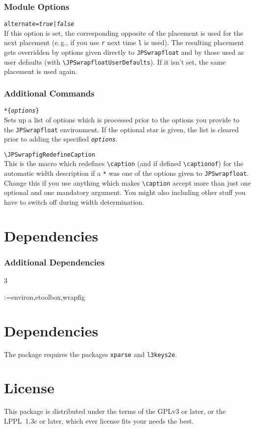 \documentclass[a4paper,10pt]{scrartcl}
\makeatletter
\newenvironment{codedescription*}{%
  \parindent=-3em
  \parskip=1em plus 2pt minus 2pt
  \vskip-\lastskip
  \hspace*{\parindent}\ignorespaces
}{\par}
\newcommand*\dependencies[2][3]{%
  \@ifstar
    {\section{Dependencies}}
    {\subsubsection{Additional Dependencies}}%
  \begin{multicols}{#1}
    \begin{itemize}%
      \@for\cs:={#2}\do{%
        \item\texttt{\cs}}%
    \end{itemize}%
  \end{multicols}}%
\newcommand*\optionTF{\textit{true}{\normalfont|}\textit{false}}
\makeatother
\begin{document}
\subsubsection{Module Options}
\begin{codedescription*}
\texttt{alternate=\optionTF}\\
  If this option is set, the corresponding opposite of the placement is used for
  the next placement (e.\,g., if you use \texttt{r} next time \texttt{l} is
  used). The resulting placement gets overridden by options given directly to
  \texttt{JPSwrapfloat} and by those used as user defaults (with
  \verb|\JPSwrapfloatUserDefaults|). If it isn't set, the same placement is used
  again.
\end{codedescription*}

\subsubsection{Additional Commands}
\begin{codedescription*}
\texttt{\string\JPSwrapfloatUserDefaults\textit{*}\{\textit{options}\}}\\
  Sets up a list of options which is processed prior to the options you provide
  to the \texttt{JPSwrapfloat} environment. If the optional star is given, the
  list is cleared prior to adding the specified \texttt{\textit{options}}.

\verb|\JPSwrapfigRedefineCaption|\\
  This is the macro which redefines \verb|\caption| (and if defined
  \verb|\captionof|) for the automatic width description if a \texttt{*} was one
  of the options given to \texttt{JPSwrapfloat}. Change this if you use anything
  which makes \verb|\caption| accept more than just one optional and one
  mandatory argument. You might also including other stuff you have to switch
  off during width determination.
\end{codedescription*}

\dependencies{environ,etoolbox,wrapfig}

\section{Dependencies}
The package requires the packages \texttt{xparse} and \texttt{l3keys2e}.

\section{License}
This package is distributed under the terms of the GPLv3 or later, or the
LPPL~1.3c or later, which ever license fits your needs the best.
\end{document}
